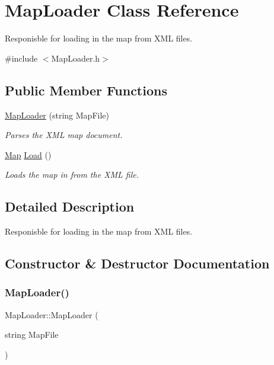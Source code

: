 \hypertarget{class_map_loader}{}\section{Map\+Loader Class Reference}
\label{class_map_loader}


Responisble for loading in the map from X\+ML files.  




{\ttfamily \#include $<$Map\+Loader.\+h$>$}

\subsection*{Public Member Functions}
\begin{DoxyCompactItemize}
\item 
\hyperlink{class_map_loader_a5130ee7aa0d69b3b882cd618a2ed0018}{Map\+Loader} (string Map\+File)
\begin{DoxyCompactList}\small\item\em Parses the X\+ML map document. \end{DoxyCompactList}\item 
\hyperlink{class_map}{Map} \hyperlink{class_map_loader_a9091d4af0b00a48ae7d9e8e1e46cd0fd}{Load} ()
\begin{DoxyCompactList}\small\item\em Loads the map in from the X\+ML file. \end{DoxyCompactList}\end{DoxyCompactItemize}


\subsection{Detailed Description}
Responisble for loading in the map from X\+ML files. 



\subsection{Constructor \& Destructor Documentation}
\mbox{\label{class_map_loader_a5130ee7aa0d69b3b882cd618a2ed0018}} 
\subsubsection{\texorpdfstring{Map\+Loader()}{MapLoader()}}
{\footnotesize\ttfamily Map\+Loader\+::\+Map\+Loader (\begin{DoxyParamCaption}\item[{string}]{Map\+File }\end{DoxyParamCaption})}



